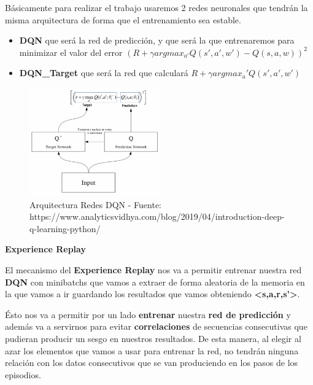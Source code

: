 \documentclass[
  a4paper,
  DIV=11,
  numbers=noendperiod]{scrreprt}
\providecommand{\tightlist}{%
  \setlength{\itemsep}{0pt}\setlength{\parskip}{0pt}}\usepackage{longtable,booktabs,array}
\begin{document}
Básicamente para realizar el trabajo usaremos 2 redes neuronales que
tendrán la misma arquitectura de forma que el entrenamiento sea estable.

\begin{itemize}
\tightlist
\item
  \textbf{DQN} que será la red de predicción, y que será la que
  entrenaremos para minimizar el valor del error
  \((R+\gamma argmax_{a'}Q(s',a',w')-Q(s,a,w))^2\)
\item
  \textbf{DQN\_Target} que será la red que calculará
  \(R+\gamma argmax_a'Q(s',a',w')\)
\end{itemize}

\begin{figure}

{\centering \includegraphics[width=0.5\textwidth,height=\textheight]{imagenes/reinforcement_learning/rl_arquitectura_redes.png}

}

\caption{Arquitectura Redes DQN - Fuente:
https://www.analyticsvidhya.com/blog/2019/04/introduction-deep-q-learning-python/}

\end{figure}

\textbf{Experience Replay}

El mecanismo del \textbf{Experience Replay} nos va a permitir entrenar
nuestra red \textbf{DQN} con minibatchs que vamos a extraer de forma
aleatoria de la memoria en la que vamos a ir guardando los resultados
que vamos obteniendo \textbf{\textless s,a,r,s'\textgreater{}}.

Ésto nos va a permitir por un lado \textbf{entrenar} nuestra \textbf{red
de predicción} y además va a servirnos para evitar
\textbf{correlaciones} de secuencias consecutivas que pudieran producir
un sesgo en nuestros resultados. De esta manera, al elegir al azar los
elementos que vamos a usar para entrenar la red, no tendrán ninguna
relación con los datos consecutivos que se van produciendo en los pasos
de los episodios.
\end{document}
